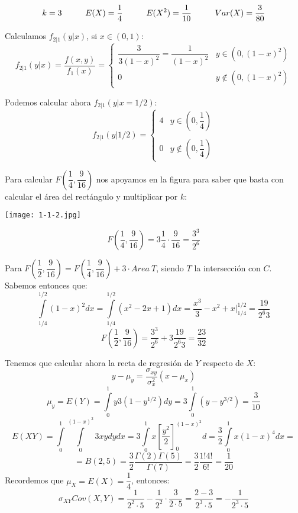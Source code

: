 \documentclass[openany]{book}
\begin{document}
\begin{exercise}
    $$ k = 3 \hspace{10mm} E(X) = \dfrac{1}{4}\hspace{10mm} E(X^2) = \dfrac{1}{10} \hspace{10mm} Var(X) = \dfrac{3}{80} $$
    
    Calculamos $ f_{2|1}(y|x) $, si $ x \in (0,1) $:
    $$ f_{2|1}(y|x) = \dfrac{f(x,y)}{f_{1}(x)} = \left\{
    \begin{array}{lr}
        \dfrac{3}{3(1-x)^2} = \dfrac{1}{(1-x)^2} & y \in (0,(1-x)^2)\\
        0 & y \not \in (0,(1-x)^2)
    \end{array}
    \right. $$

    Podemos calcular ahora $ f_{2|1}(y|x=1/2) $:
    $$ f_{2|1}(y|1/2) = \left\{
    \begin{array}{lr}
        4 & y \in (0,\dfrac{1}{4}) \\\\
        0 & y \not \in (0,\dfrac{1}{4})
    \end{array}
    \right. $$

    Para calcular $ F\left(\dfrac{1}{4},\dfrac{9}{16}\right) $ nos apoyamos en la figura para saber que basta con calcular el área del rectángulo y multiplicar por $ k $:
    
    \begin{center}
        \texttt{[image: 1-1-2.jpg]}
    \end{center}
    

    $$ F\left(\dfrac{1}{4},\dfrac{9}{16}\right) = 3 \dfrac{1}{4}\cdot \dfrac{9}{16} = \dfrac{3^3}{2^{6}}$$

    Para $ F\left(\dfrac{1}{2},\dfrac{9}{16}\right) = F\left(\dfrac{1}{4},\dfrac{9}{16}\right)+3\cdot Area\ T $, siendo $ T $ la intersección con $ C $. Sabemos entonces que:
    $$ \int\limits_{1/4}^{1/2}(1-x)^2dx = \int\limits_{1/4}^{1/2}(x^2-2x+1)dx = \dfrac{x^3}{3}-x^2+x \Biggr|_{1/4}^{1/2} = \dfrac{19}{2^{6}3} $$
    $$ F\left(\dfrac{1}{2},\dfrac{9}{16}\right) = \dfrac{3^3}{2^{6}} + 3 \dfrac{19}{2 ^{6}3} = \dfrac{23}{32} $$

    Tenemos que calcular ahora la recta de regresión de $ Y $ respecto de $ X $:
    $$ y - \mu_{y} = \dfrac{\sigma _{xy}}{\sigma_{x}^2}(x-\mu_{x}) $$
    $$ \mu_{y} = E(Y) = \int\limits_{0}^{1} y 3(1-y^{1/2})dy = 3 \int\limits_{0}^{1}(y-y^{3/2}) = \dfrac{3}{10} $$
    $$ E(XY) = \int\limits_{0}^{1} \int\limits_{0}^{(1-x)^2} 3xy dy dx = 3 \int\limits_{0}^{1} x \left[\dfrac{y^2}{2}\right]_{0} ^{(1-x)^2} d = \dfrac{3}{2} \int\limits_{0}^{1}x(1-x)^{4}dx = $$
    $$ = B(2,5) = \dfrac{3}{2} \dfrac{\Gamma(2)\Gamma(5)}{\Gamma(7)}= \dfrac{3}{2} \dfrac{1!4!}{6!} = \dfrac{1}{20} $$
    Recordemos que $ \mu_{X} = E(X) = \dfrac{1}{4} $, entonces:
    $$ \sigma_{XY}Cov(X,Y) = \dfrac{1}{2^2\cdot 5} -\dfrac{1}{2^2}\cdot \dfrac{3}{2\cdot 5} = \dfrac{2-3}{2^3\cdot 5} = -\dfrac{1}{2^3\cdot 5}$$


\end{exercise}
\end{document}

